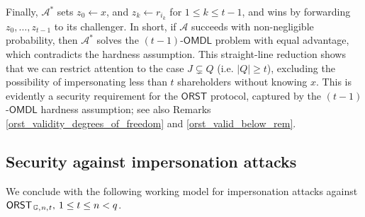 \documentclass[10pt, psamsfonts, reqno]{amsart}
\theoremstyle{definition}
\theoremstyle{remark}
\numberwithin{equation}{section}
\begin{document}
Finally,
$\mathcal{A}^*$ sets $z_0 \leftarrow x$,
and $z_k \leftarrow r_{i_k}$ for $1 \le k \le t-1$,
and wins by forwarding
$z_0, \dots, z_{t-1}$ to its challenger.
In short, if $\mathcal{A}$ succeeds
with non-negligible probability, then $\mathcal{A}^*$
solves the $(t-1)$-$\mathsf{OMDL}$ problem with equal advantage,
which contradicts the hardness assumption.
This straight-line reduction shows that we can restrict attention
to the case $J \subsetneq Q$ (i.e. $|Q| \ge t$),
excluding the possibility of impersonating less than $t$
shareholders without knowing $x$.
This is evidently a security requirement for the $\mathsf{ORST}$
protocol, captured by the $(t-1)$-$\mathsf{OMDL}$
hardness assumption; see also Remarks
\ref{orst_validity_degrees_of_freedom} and
\ref{orst_valid_below_rem}.

\subsection{Security against impersonation attacks}\label{section_security_imp}

\noindent
We conclude with the following working model
for impersonation attacks against
$
\mathsf{ORST}
	_{\hspace{1pt}\mathbb{G},\hspace{0.5pt} n,\hspace{0.5pt} t},
\hspace{2pt} 1 \le t \le n < q
$.
\end{document}
